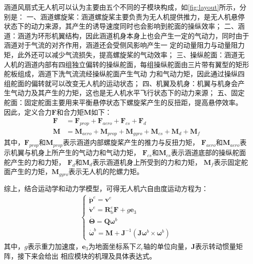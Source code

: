 涵道风扇式无人机可以认为主要由五个不同的子模块构成，如\autoref{fig:layout}所示，分别是：
一、涵道螺旋桨：涵道螺旋桨主要负责为无人机提供推力，是无人机悬停状态下的动力来源，其产生的诱导速度同时也会影响到舵面的操纵效率；
二、涵道：涵道为环形机翼结构，因此涵道机身本身上也会产生一定的气动力，同时由于涵道对于气流的对齐作用，涵道还会受侧风影响产生一
定的动量阻力与动量阻力矩，此外还可以减少气流损失，提高螺旋桨的气动效率；
三、操纵舵面：涵道无人机的涵道内部有四组独立偏转的操纵舵面，每组操纵舵面由三片带有翼型的矩形舵板组成，涵道下洗气流流经操纵舵面产生气动
力和气动力矩，因此通过操纵四组舵面的偏转就可以改变无人机的运动状态；
四、机翼及机身：机翼与机身会产生气动力及其产生的力矩，这也是无人机水平飞行状态下的动力来源；
五、固定舵面：固定舵面主要用来平衡悬停状态下螺旋桨产生的反扭距，提高悬停效率。
因此，定义合力$\mathbf{F}$和合力矩$\mathbf{M}$如下：
\begin{align}
    \mathbf{F} & =\mathbf{F}_{prop}+\mathbf{F}_{aero}+\mathbf{F}_{cs}+\mathbf{F}_{d}\\
    \mathbf{M} & =\mathbf{M}_{aero}+\mathbf{M}_{prop}+\mathbf{M}_{gyro}+\mathbf{M}_{cs}+\mathbf{M}_{d}+\mathbf{M}_{f}
\end{align}
其中，$\mathbf{F}_{prop}$和$\mathbf{M}_{prop}$表示涵道内部螺旋桨产生的推力与反扭力矩，
$\mathbf{F}_{aero}$和$\mathbf{M}_{aero}$表示机翼与机身上所产生的气动力和气动力矩，
$\mathbf{F}_{cs}$和$\mathbf{M}_{cs}$表示涵道底部的操纵舵面舵产生的力和力矩，
$\mathbf{F}_{d}$和$\mathbf{M}_{d}$表示涵道机身上所受到的力和力矩，
$\mathbf{M}_{f}$表示固定舵面产生的力矩，$\mathbf{M}_{gyro}$表示无人机的陀螺力矩。

综上，结合运动学和动力学模型，可得无人机六自由度运动方程为：
\begin{align}
\left\{\begin{array}{l}
    \dot{\mathbf{p}}^{e}=\mathbf{v}^{e} \\
    \dot{\mathbf{v}}^{e}=\mathbf{R}_{\mathrm{b}}^{e} \mathbf{F}+g\mathbf{e}_{3} \\
    \dot{\mathbf{\Theta}}=\mathbf{Q} {\mathbf{\omega}}^{b} \\
    \dot{\mathbf{\omega}}^{b}=\mathbf{M}+\mathbf{J}^{-1}\left(\mathbf{J} {\mathbf{\omega}}^{b} \times {\mathbf{\omega}}^{b}\right)
    \end{array}\right.
\end{align}
其中，$g$表示重力加速度，$\mathbf{e}_{3}$为地面坐标系下$Z_{e}$轴的单位向量，$\mathbf{J}$表示转动惯量矩阵，接下来会给出
相应模块的机理及具体表达式。
